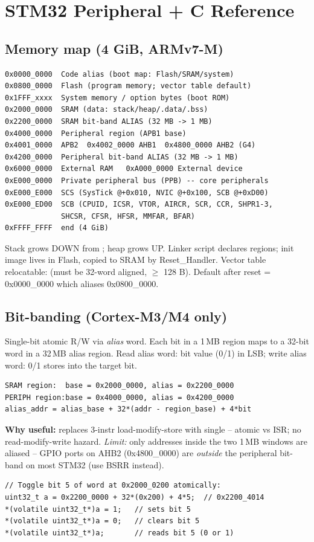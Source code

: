 \section{STM32 Peripheral + C Reference}

\subsection{Memory map (4 GiB, ARMv7-M)}
\begin{lstlisting}[language={}]
0x0000_0000  Code alias (boot map: Flash/SRAM/system)
0x0800_0000  Flash (program memory; vector table default)
0x1FFF_xxxx  System memory / option bytes (boot ROM)
0x2000_0000  SRAM (data: stack/heap/.data/.bss)
0x2200_0000  SRAM bit-band ALIAS (32 MB -> 1 MB)
0x4000_0000  Peripheral region (APB1 base)
0x4001_0000  APB2  0x4002_0000 AHB1  0x4800_0000 AHB2 (G4)
0x4200_0000  Peripheral bit-band ALIAS (32 MB -> 1 MB)
0x6000_0000  External RAM   0xA000_0000 External device
0xE000_0000  Private peripheral bus (PPB) -- core peripherals
0xE000_E000  SCS (SysTick @+0x010, NVIC @+0x100, SCB @+0xD00)
0xE000_ED00  SCB (CPUID, ICSR, VTOR, AIRCR, SCR, CCR, SHPR1-3,
             SHCSR, CFSR, HFSR, MMFAR, BFAR)
0xFFFF_FFFF  end (4 GiB)
\end{lstlisting}
Stack grows DOWN from ; heap grows UP. Linker script declares regions;  init image lives in Flash, copied to SRAM by Reset\_Handler. Vector table relocatable:  (must be 32-word aligned, $\geq$ 128 B). Default after reset = 0x0000\_0000 which aliases 0x0800\_0000.

\subsection{Bit-banding (Cortex-M3/M4 only)}
Single-bit atomic R/W via \emph{alias} word. Each bit in a 1\,MB region maps to a 32-bit word in a 32\,MB alias region. Read alias word: bit value (0/1) in LSB; write alias word: 0/1 stores into the target bit.
\begin{lstlisting}[language={}]
SRAM region:  base = 0x2000_0000, alias = 0x2200_0000
PERIPH region:base = 0x4000_0000, alias = 0x4200_0000
alias_addr = alias_base + 32*(addr - region_base) + 4*bit
\end{lstlisting}
\textbf{Why useful:} replaces 3-instr load-modify-store with single  -- atomic vs ISR; no read-modify-write hazard. \emph{Limit:} only addresses inside the two 1\,MB windows are aliased -- GPIO ports on AHB2 (0x4800\_0000) are \emph{outside} the peripheral bit-band on most STM32 (use BSRR instead).
\begin{lstlisting}[language={}]
// Toggle bit 5 of word at 0x2000_0200 atomically:
uint32_t a = 0x2200_0000 + 32*(0x200) + 4*5;  // 0x2200_4014
*(volatile uint32_t*)a = 1;   // sets bit 5
*(volatile uint32_t*)a = 0;   // clears bit 5
*(volatile uint32_t*)a;       // reads bit 5 (0 or 1)
\end{lstlisting}

